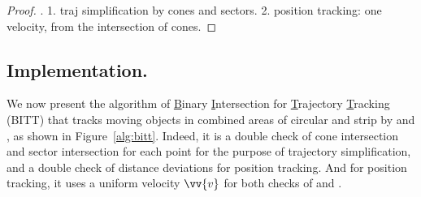 \begin{proof}
	\todo.
	1. traj simplification by cones and sectors.
	2. position tracking: one velocity, from the intersection of cones.
\end{proof}




\subsection{Implementation.}
We now present the algorithm of \underline{B}inary \underline{I}ntersection for \underline{T}rajectory \underline{T}racking (BITT) that tracks moving objects in combined areas of circular and strip by \sed and \ped, as shown in Figure~\ref{alg:bitt}. 
%
Indeed, it is a double check of cone intersection and sector intersection for each point for the purpose of trajectory simplification, and a double check of distance deviations for position tracking. And for position tracking, it uses a uniform velocity $\vv{v}$ for both checks of \sed and \ped. %

